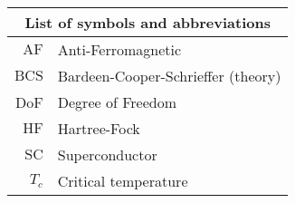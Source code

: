 
	\thispagestyle{plain}
	\begin{table}
		\centering
		\begin{tabular}{r l}
			\multicolumn{2}{c}{\textbf{List of symbols and abbreviations}} \\
			\midrule
			$\mathrm{AF}$ & Anti-Ferromagnetic \\
			$\mathrm{BCS}$ & Bardeen-Cooper-Schrieffer (theory) \\
			DoF & Degree of Freedom \\
			$\mathrm{HF}$ & Hartree-Fock \\
			$\mathrm{SC}$ & Superconductor \\
			$T_c$ & Critical temperature \\
		\end{tabular}
	\end{table}
\restoregeometry 
